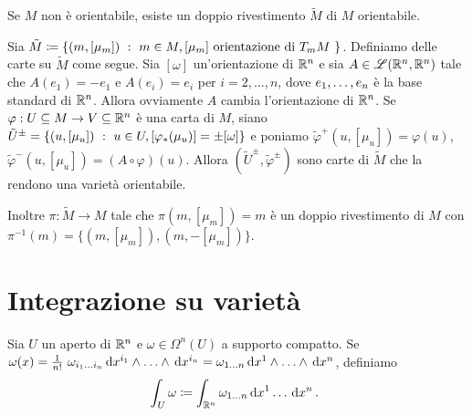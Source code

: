 \begin{remark}
	Se $M$ non è orientabile, esiste un doppio rivestimento $\tilde M$ di $M$ orientabile.
	
	Sia $\tilde M \coloneqq \{ (m,[\mu_m]) \suchthat m\in M, \text{$[\mu_m]$ orientazione di $T_mM$ } \}$. Definiamo delle carte su $\tilde M$ come segue. Sia $[\omega]$ un'orientazione di $\R^n$ e sia $A\in\Lin(\R^n,\R^n)$ tale che $A(e_1) = -e_1$ e $A(e_i) = e_i$ per $i=2,\ldots,n$, dove $\seqb en,$ è la base standard di $\R^n$. Allora ovviamente $A$ cambia l'orientazione di $\R^n$.
	Se $\varphi:U\subseteq M \to V\subseteq \R^n$ è una carta di $M$, siano $\tilde U^\pm = \{ (u,[\mu_u]) \suchthat u \in U, [\varphi_*(\mu_u)] = \pm[\omega] \}$ e poniamo $\tilde\varphi^+(u,[\mu_u]) = \varphi(u)$, $\tilde\varphi^-(u,[\mu_u]) = (A\circ\varphi)(u)$.
	Allora $(\tilde U^\pm,\tilde\varphi^\pm)$ sono carte di $\tilde M$ che la rendono una varietà orientabile.
	
	Inoltre $\pi:\tilde M\to M$ tale che $\pi(m, [\mu_m]) = m$ è un doppio rivestimento di $M$ con $\pi^{-1}(m) = \{ (m,[\mu_m] ), (m,-[\mu_m]) \}$.
\end{remark}


\section{Integrazione su varietà}

\begin{definition}
	Sia $U$ un aperto di $\R^n$ e $\omega\in\Omega^n(U)$ a supporto compatto. Se $\omega(x) = \frac 1{n!}\ \omega_{\seqb in{}} \de x^{i_1}\wedge \ldots \wedge \de x^{i_n} = \omega_{1\ldots n} \seqa{\de x}n\wedge$, definiamo
	\begin{equation*}
		\int_U \omega \coloneqq \int_{\R^n} \omega_{1 \ldots n} \seqa {\de x}n{} \punto 
	\end{equation*}
\end{definition}

